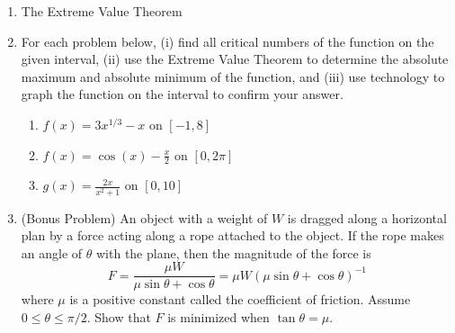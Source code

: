 \documentclass[11pt,fleqn]{article}
\begin{document}
\setlength{\parindent}{0cm}
\renewcommand{\headrulewidth}{0pt}
\newcommand{\blank}[1]{\rule{#1}{0.75pt}}
\renewcommand{\d}{\displaystyle}
\vspace*{-0.7in}
\begin{center}
 {\large{ }}
\end{center}
 \begin{enumerate}
 \item The Extreme Value Theorem
 \vspace{2in}
 \item For each problem below, (i) find all critical numbers of the function on the given interval, (ii) use the Extreme Value Theorem to determine the absolute maximum and absolute minimum of the function, and (iii) use technology to graph the function on the interval to confirm your answer.
 \begin{enumerate}
 \item $f(x)=3x^{1/3}-x$ on $[-1,8]$
 \newpage
 \item $f(x)=\cos(x) - \frac{x}{2}$ on $[0,2\pi]$
 \vfill
 \item $g(x)=\frac{2x}{x^2+1}$ on $[0,10]$
 \vfill
 \end{enumerate}
\item (Bonus Problem) An object with a weight of $W$ is dragged along a horizontal plan by a force acting along a rope attached to the object. If the rope makes an angle of $\theta$ with the plane, then the magnitude of the force is
 $$F=\frac{\mu W}{\mu \sin \theta + \cos \theta}=\mu W (\mu \sin \theta + \cos \theta)^{-1}$$ where $\mu$ is a positive constant called the coefficient of friction. Assume $0 \leq \theta \leq \pi/2.$ Show that $F$ is minimized when $\tan \theta = \mu.$
 \vspace{1.5in}
 \end{enumerate}
\end{document}
